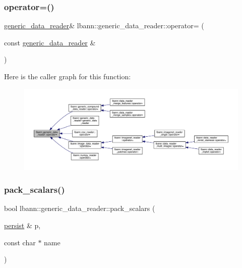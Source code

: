 \mbox{\label{classlbann_1_1generic__data__reader_aec7e626e6efa2a4bf23f931e2ef8f607}} 
\subsubsection{\texorpdfstring{operator=()}{operator=()}}
{\footnotesize\ttfamily \hyperlink{classlbann_1_1generic__data__reader}{generic\+\_\+data\+\_\+reader}\& lbann\+::generic\+\_\+data\+\_\+reader\+::operator= (\begin{DoxyParamCaption}\item[{const \hyperlink{classlbann_1_1generic__data__reader}{generic\+\_\+data\+\_\+reader} \&}]{ }\end{DoxyParamCaption})\hspace{0.3cm}{\ttfamily [default]}}

Here is the caller graph for this function\+:\nopagebreak
\begin{figure}[H]
\begin{center}
\leavevmode
\includegraphics[width=350pt]{classlbann_1_1generic__data__reader_aec7e626e6efa2a4bf23f931e2ef8f607_icgraph}
\end{center}
\end{figure}
\mbox{\label{classlbann_1_1generic__data__reader_a93dddd2276ddc34cc97922ee27c44582}} 
\subsubsection{\texorpdfstring{pack\+\_\+scalars()}{pack\_scalars()}}
{\footnotesize\ttfamily bool lbann\+::generic\+\_\+data\+\_\+reader\+::pack\+\_\+scalars (\begin{DoxyParamCaption}\item[{\hyperlink{classlbann_1_1persist}{persist} \&}]{p,  }\item[{const char $\ast$}]{name }\end{DoxyParamCaption})\hspace{0.3cm}{\ttfamily [inline]}}



